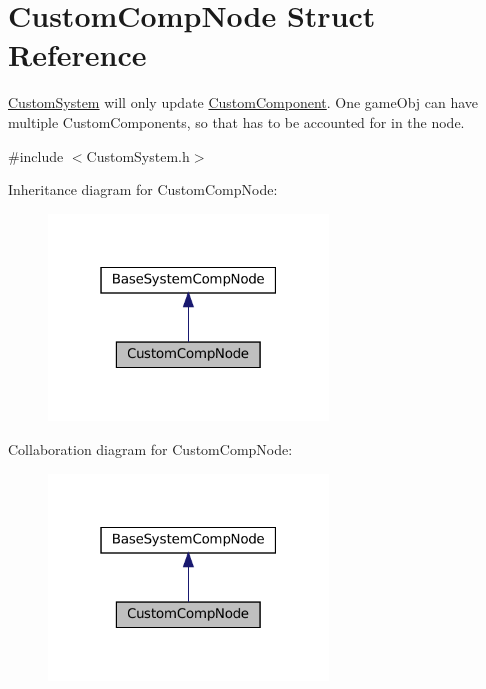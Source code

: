 \hypertarget{structCustomCompNode}{}\section{Custom\+Comp\+Node Struct Reference}
\label{structCustomCompNode}


\hyperlink{classCustomSystem}{Custom\+System} will only update \hyperlink{classCustomComponent}{Custom\+Component}. One game\+Obj can have multiple Custom\+Components, so that has to be accounted for in the node.  




{\ttfamily \#include $<$Custom\+System.\+h$>$}



Inheritance diagram for Custom\+Comp\+Node\+:
\nopagebreak
\begin{figure}[H]
\begin{center}
\leavevmode
\includegraphics[width=211pt]{structCustomCompNode__inherit__graph}
\end{center}
\end{figure}


Collaboration diagram for Custom\+Comp\+Node\+:
\nopagebreak
\begin{figure}[H]
\begin{center}
\leavevmode
\includegraphics[width=211pt]{structCustomCompNode__coll__graph}
\end{center}
\end{figure}
